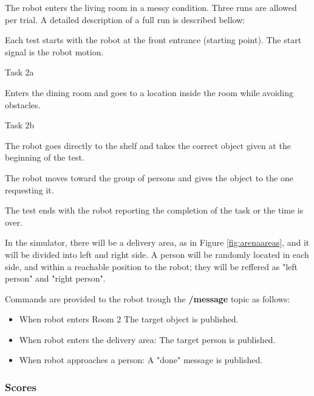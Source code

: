 \documentclass{article}
\newcommand{\SubItem}[1]{
    {\setlength\itemindent{15pt} \item[-] #1}
}
\begin{document}
The robot enters the living room in a messy condition. Three runs are allowed per trial. A detailed description of a full run is described bellow:

\begin{itemize}
    \item Each test starts with the robot at the front entrance (starting point). The start signal is the robot motion.
    \item Task 2a
        \SubItem{Enters the dining room and goes to a location inside the room while avoiding obstacles.}
    \item Task 2b
        \SubItem{The robot goes directly to the shelf and takes the correct object given at the beginning of the test.}
        \SubItem{The robot moves toward the group of persons and gives the object to the one requesting it.}
        \SubItem{The test ends with the robot reporting the completion of the task or the time is over.}
\end{itemize}

In the simulator, there will be a delivery area, as in Figure \ref{fig:arenaareas}, and it will be divided into left and right side. A person will be randomly located in each side, and within a reachable position to the robot; they will be reffered as "left person" and "right person".

Commands are provided to the robot trough the \textbf{/message} topic as follows:

\begin{itemize}
    \item When robot enters Room 2 The target object is published.
    \item When robot enters the delivery area: The target person is published.
    \item When robot approaches a person: A "done" message is published.
\end{itemize}

\subsubsection{Scores} \label{sec:scores}
\end{document}
